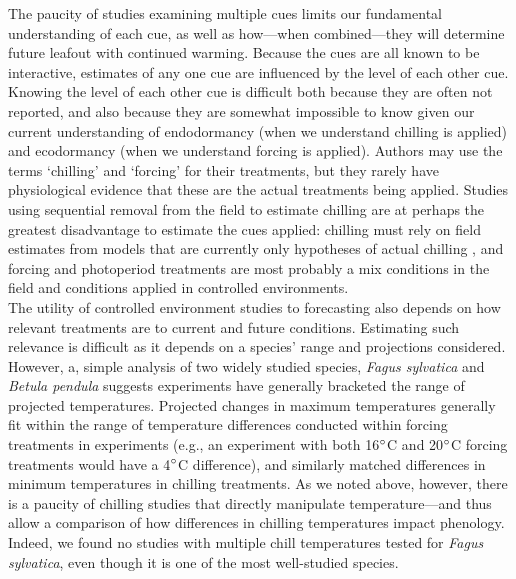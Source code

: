 \documentclass[11pt,letter]{article}
\begin{document}
The paucity of studies examining multiple cues limits our fundamental understanding of each cue, as well as how---when combined---they will determine future leafout with continued warming. Because the cues are all known to be interactive, estimates of any one cue are influenced by the level of each other cue. Knowing the level of each other cue is difficult both because they are often not reported, and also because they are somewhat impossible to know given our current understanding of endodormancy (when we understand chilling is applied) and ecodormancy (when we understand forcing is applied). Authors may use the terms `chilling' and `forcing' for their treatments, but they rarely have physiological evidence that these are the actual treatments being applied. Studies using sequential removal from the field to estimate chilling are at perhaps the greatest disadvantage to estimate the cues applied: chilling must rely on field estimates from models that are currently only hypotheses of actual chilling \citep{dennis2003}, and forcing and photoperiod treatments are most probably a mix conditions in the field and conditions applied in controlled environments. \\%

The utility of controlled environment studies to forecasting also depends on how relevant treatments are to current and future conditions. Estimating such relevance is difficult as it depends on a species' range and projections considered. However, a, simple analysis of two widely studied species, \emph{Fagus sylvatica} and \emph{Betula pendula} suggests experiments have generally bracketed the range of projected temperatures. Projected changes in maximum temperatures generally fit within the range of temperature differences conducted within forcing treatments in experiments (e.g., an experiment with both 16$\degree$C  and 20$\degree$C forcing treatments would have a 4$\degree$C difference), and similarly matched differences in minimum temperatures in chilling treatments. As we noted above, however, there is a paucity of chilling studies that directly manipulate temperature---and thus allow a comparison of how differences in chilling temperatures impact phenology. Indeed, we found no studies with multiple chill temperatures tested for \emph{Fagus sylvatica}, even though it is one of the most well-studied species. \\
\end{document}
